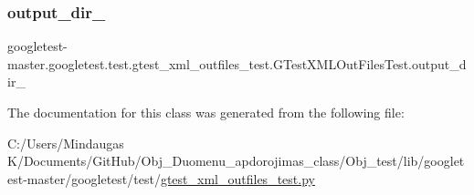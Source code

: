 \subsubsection{\texorpdfstring{output\_dir\_}{output\_dir\_}}
{\footnotesize\ttfamily googletest-\/master.\+googletest.\+test.\+gtest\+\_\+xml\+\_\+outfiles\+\_\+test.\+G\+Test\+X\+M\+L\+Out\+Files\+Test.\+output\+\_\+dir\+\_\+}



The documentation for this class was generated from the following file\+:\begin{DoxyCompactItemize}
\item 
C\+:/\+Users/\+Mindaugas K/\+Documents/\+Git\+Hub/\+Obj\+\_\+\+Duomenu\+\_\+apdorojimas\+\_\+class/\+Obj\+\_\+test/lib/googletest-\/master/googletest/test/\mbox{\hyperlink{_obj__test_2lib_2googletest-master_2googletest_2test_2gtest__xml__outfiles__test_8py}{gtest\+\_\+xml\+\_\+outfiles\+\_\+test.\+py}}\end{DoxyCompactItemize}
